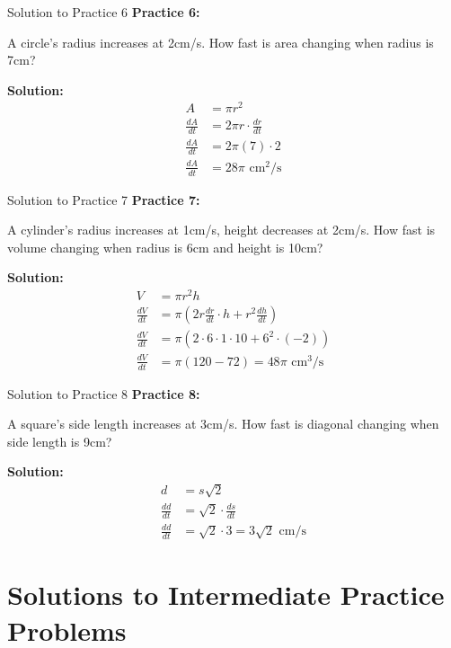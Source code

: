 \documentclass[aspectratio=169]{beamer}
\begin{document}
\begin{frame}{Solution to Practice 6}
\textbf{Practice 6:}

A circle's radius increases at 2cm/s. How fast is area changing when radius is 7cm?

\textbf{Solution:}
\[
\begin{aligned}
  A &= \pi r^2 \\
  \frac{dA}{dt} &= 2\pi r \cdot \frac{dr}{dt} \\
  \frac{dA}{dt} &= 2\pi(7) \cdot 2 \\
  \frac{dA}{dt} &= 28\pi \text{ cm}^2\text{/s}
\end{aligned}
\]
\end{frame}

\begin{frame}{Solution to Practice 7}
\textbf{Practice 7:}

A cylinder's radius increases at 1cm/s, height decreases at 2cm/s. How fast is volume changing when radius is 6cm and height is 10cm?

\textbf{Solution:}
\[
\begin{aligned}
  V &= \pi r^2 h \\
  \frac{dV}{dt} &= \pi(2r\frac{dr}{dt} \cdot h + r^2\frac{dh}{dt}) \\
  \frac{dV}{dt} &= \pi(2 \cdot 6 \cdot 1 \cdot 10 + 6^2 \cdot (-2)) \\
  \frac{dV}{dt} &= \pi(120 - 72) = 48\pi \text{ cm}^3\text{/s}
\end{aligned}
\]
\end{frame}

\begin{frame}{Solution to Practice 8}
\textbf{Practice 8:}

A square's side length increases at 3cm/s. How fast is diagonal changing when side length is 9cm?

\textbf{Solution:}
\[
\begin{aligned}
  d &= s\sqrt{2} \\
  \frac{dd}{dt} &= \sqrt{2} \cdot \frac{ds}{dt} \\
  \frac{dd}{dt} &= \sqrt{2} \cdot 3 = 3\sqrt{2} \text{ cm/s}
\end{aligned}
\]
\end{frame}

\section{Solutions to Intermediate Practice Problems}
\end{document}
